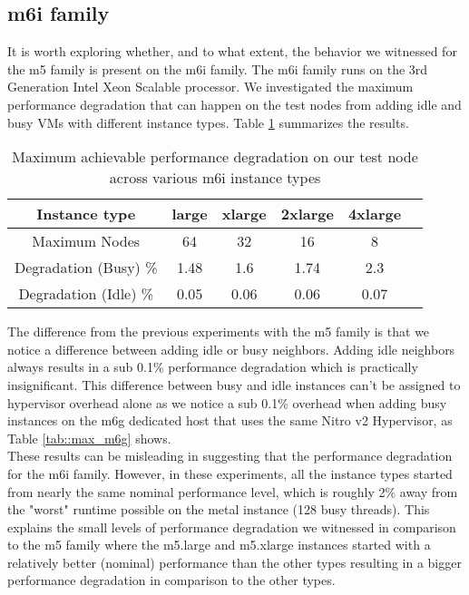 \subsection{m6i family}
It is worth exploring whether, and to what extent, the behavior we witnessed for the m5 family 
is present on the m6i family. The m6i family runs on the 3rd Generation Intel Xeon Scalable 
processor. We investigated the maximum performance degradation that can happen on the test nodes 
from adding idle and busy VMs with different instance types. Table \ref{tab::max_m6i} summarizes
the results.
\begin{table}[H]
\begin{center}
\begin{tabular}{ |c|c|c|c|c|c }
 Instance type & large & xlarge & 2xlarge & 4xlarge \\
 \hline
 Maximum Nodes & 64 & 32 & 16 & 8  \\
 \hline
Degradation (Busy) \% & 1.48 & 1.6 & 1.74 & 2.3  \\ 
\hline 
Degradation (Idle) \% & 0.05 & 0.06 & 0.06 & 0.07  \\ 
\end{tabular}
\end{center}
\caption{Maximum achievable performance degradation on our test node across various m6i instance types}
\label{tab::max_m6i}
\end{table}
\noindent
The difference from the previous experiments with the m5 family is that we notice a difference between 
adding idle or busy neighbors. Adding idle neighbors always results in a sub 0.1\% performance 
degradation which is practically insignificant. This difference between busy and idle instances can't be 
assigned to hypervisor overhead alone as we notice a sub 0.1\% overhead when adding busy instances
on the m6g dedicated host that uses the same Nitro v2 Hypervisor, as Table \ref{tab::max_m6g} shows.\\
These results can be misleading in 
suggesting that the performance degradation for the m6i family. 
However, in these experiments, all the instance types started from nearly the same nominal performance 
level, which is roughly 2\% away from the "worst" runtime possible on the metal instance (128 busy 
threads). This explains the small levels of performance degradation we witnessed in comparison to the m5 family 
where the m5.large and m5.xlarge instances started with a relatively better (nominal) performance than 
the other types resulting in a bigger performance degradation in comparison to the other types. 
